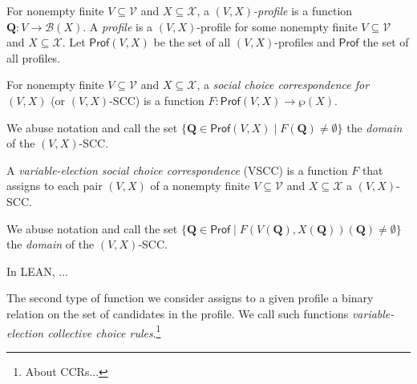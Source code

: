 \documentclass[runningheads]{llncs}
\begin{document}

\begin{definition} \textnormal{For nonempty finite $V\subseteq\mathcal{V}$ and $X\subseteq\mathcal{X}$, a \emph{$(V,X)$-profile} is a function $\mathbf{Q}:V\to \mathcal{B}(X)$. A \textit{profile} is a $(V,X)$-profile for some nonempty finite $V\subseteq\mathcal{V}$ and $X\subseteq\mathcal{X}$. Let $\mathsf{Prof}(V,X)$ be the set of all $(V,X)$-profiles and $\mathsf{Prof}$ the set of all profiles.}\end{definition}

\begin{definition} \textnormal{For nonempty finite $V\subseteq\mathcal{V}$ and $X\subseteq\mathcal{X}$, a \textit{social choice correspondence for $(V,X)$} (or $(V,X)$-SCC) is a function  $F: \mathsf{Prof}(V,X)\to \wp(X)$.}

\textnormal{We abuse notation and call the set $\{\mathbf{Q}\in\mathsf{Prof}(V,X)\mid F(\mathbf{Q})\neq\emptyset \}$ the \textit{domain} of the $(V,X)$-SCC.}
\end{definition}

\begin{definition} \textnormal{A \textit{variable-election social choice correspondence} (VSCC) is a function $F$ that assigns to each pair $(V,X)$ of a nonempty finite $V\subseteq \mathcal{V}$ and $X\subseteq\mathcal{X}$ a $(V,X)$-SCC.}

\textnormal{We abuse notation and call the set $\{\mathbf{Q}\in\mathsf{Prof}\mid F(V(\mathbf{Q}),X(\mathbf{Q}))(\mathbf{Q})\neq\emptyset \}$ the \textit{domain} of the $(V,X)$-SCC.}
\end{definition}



In LEAN, ...

The second type of function we consider assigns to a given profile a binary relation on the set of candidates in the profile. We call such functions \textit{variable-election collective choice rules}.\footnote{About CCRs...}  
\end{document}
